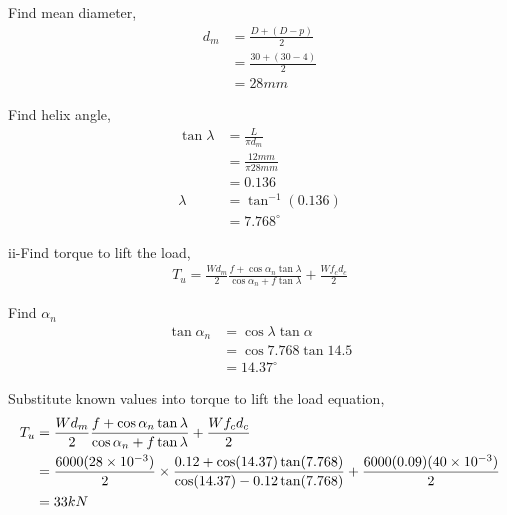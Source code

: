 \documentclass[a4paper, fleqn]{article}
\providecommand{\sci}[1]{\protect\ensuremath{\times 10^{\StrSubstitute[0]{#1}{e}{}}}}
\begin{document}
Find mean diameter,
\begin{equation*}
    \begin{aligned}
    d_m &= \frac {D+(D-p)}{2}\\  
    &= \frac {30+(30-4)}{2}\\ 
    &= 28mm
    \end{aligned}
\end{equation*}

Find helix angle,
\begin{equation*}
    \begin{aligned}
    \tan\lambda &= \frac{L}{\pi d_m}\\
    &= \frac{12mm}{\pi 28mm} \\
    &=0.136\\
    \lambda &= \tan^{-1}(0.136)\\
    &=7.768^{\circ}
    \end{aligned}
\end{equation*}

ii-Find torque to lift the load,
\begin{equation*}
    \begin{aligned}
    T_u = \frac{Wd_m}{2} \frac{f+\cos\alpha_n \tan\lambda}{\cos\alpha_n + f\tan\lambda} + \frac{Wf_c d_c}{2}
    \end{aligned}
\end{equation*}

Find $\alpha_n$
\begin{equation*}
    \begin{aligned}
    \tan \alpha_n &= \cos \lambda \tan \alpha\\
     &= \cos 7.768 \tan 14.5\\
    &= 14.37^{\circ}
    \end{aligned}
\end{equation*}

Substitute known values into torque to lift the load equation,
\begin{equation*}
    \begin{aligned}
    T_u &= \frac{Wd_m}{2} \frac{f+\cos\alpha_n \tan\lambda}{\cos\alpha_n + f\tan\lambda} + \frac{Wf_c d_c}{2} \\
    &= \frac{6000(28\sci{e-3})}{2} \times\frac{0.12+\cos(14.37) \tan(7.768)}{\cos(14.37) - 0.12\tan(7.768)} + \frac{6000(0.09)(40\sci{e-3})}{2} \\
    &= 33 kN
    \end{aligned}
\end{equation*}
\end{document}

